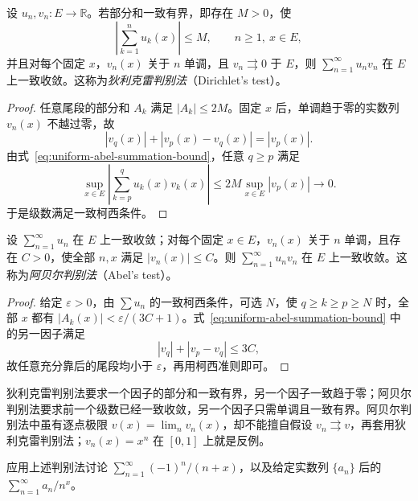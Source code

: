 \begin{theorem}[狄利克雷判别法]
\label{thm:uniform-dirichlet-test}
设 $u_n,v_n:E\to\mathbb R$。若部分和一致有界，即存在 $M>0$，使
\[
    \left|\sum_{k=1}^nu_k(x)\right|\leq M,
    \qquad n\geq1,\ x\in E,
\]
并且对每个固定 $x$，$v_n(x)$ 关于 $n$ 单调，且 $v_n\rightrightarrows0$ 于 $E$，则 $\sum_{n=1}^\infty u_nv_n$ 在 $E$ 上一致收敛。这称为\emph{狄利克雷判别法}（Dirichlet's test）。
\end{theorem}

\begin{proof}
任意尾段的部分和 $A_k$ 满足 $|A_k|\leq2M$。固定 $x$ 后，单调趋于零的实数列 $v_n(x)$ 不越过零，故
\[
    |v_q(x)|+|v_p(x)-v_q(x)|=|v_p(x)|.
\]
由式~\eqref{eq:uniform-abel-summation-bound}，任意 $q\geq p$ 满足
\[
    \sup_{x\in E}\left|\sum_{k=p}^qu_k(x)v_k(x)\right|
    \leq2M\sup_{x\in E}|v_p(x)|\longrightarrow0.
\]
于是级数满足一致柯西条件。
\end{proof}

\begin{theorem}[阿贝尔判别法]
\label{thm:uniform-abel-test}
设 $\sum_{n=1}^\infty u_n$ 在 $E$ 上一致收敛；对每个固定 $x\in E$，$v_n(x)$ 关于 $n$ 单调，且存在 $C>0$，使全部 $n,x$ 满足 $|v_n(x)|\leq C$。则 $\sum_{n=1}^\infty u_nv_n$ 在 $E$ 上一致收敛。这称为\emph{阿贝尔判别法}（Abel's test）。
\end{theorem}

\begin{proof}
给定 $\varepsilon>0$，由 $\sum u_n$ 的一致柯西条件，可选 $N$，使 $q\geq k\geq p\geq N$ 时，全部 $x$ 都有 $|A_k(x)|<\varepsilon/(3C+1)$。式~\eqref{eq:uniform-abel-summation-bound} 中的另一因子满足
\[
    |v_q|+|v_p-v_q|\leq3C,
\]
故任意充分靠后的尾段均小于 $\varepsilon$，再用柯西准则即可。
\end{proof}

狄利克雷判别法要求一个因子的部分和一致有界，另一个因子一致趋于零；阿贝尔判别法要求前一个级数已经一致收敛，另一个因子只需单调且一致有界。阿贝尔判别法中虽有逐点极限 $v(x)=\lim_n v_n(x)$，却不能擅自假设 $v_n\rightrightarrows v$，再套用狄利克雷判别法；$v_n(x)=x^n$ 在 $[0,1]$ 上就是反例。

\begin{example}
\label{ex:uniform-dirichlet-and-abel-applications}
应用上述判别法讨论 $\sum_{n=1}^\infty(-1)^n/(n+x)$，以及给定实数列 $\{a_n\}$ 后的 $\sum_{n=1}^\infty a_n/n^x$。
\end{example}

